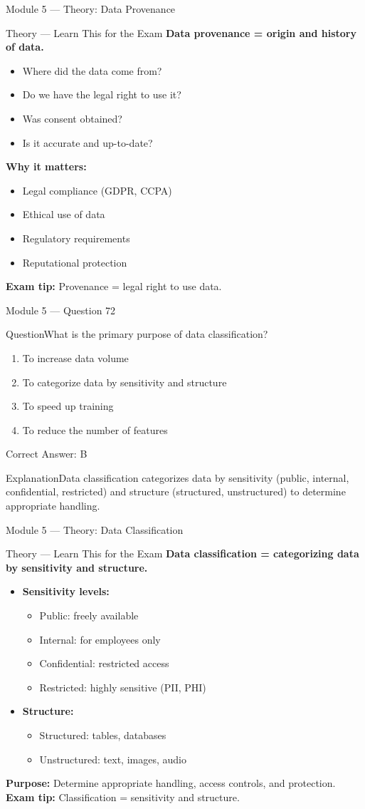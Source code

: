 \documentclass[aspectratio=169,10pt]{beamer}
\newcommand{\question}[1]{\begin{block}{Question}#1\end{block}}
\newcommand{\options}[4]{%
	\begin{enumerate}[label=\Alph*.,leftmargin=*]
		\item #1
		\item #2
		\item #3
		\item #4
	\end{enumerate}
}
\newcommand{\answerbox}[1]{\begin{exampleblock}{Correct Answer: #1}\end{exampleblock}}
\newcommand{\explain}[1]{\begin{block}{Explanation}#1\end{block}}
\newcommand{\theory}[1]{%
	\begin{block}{Theory --- Learn This for the Exam}
		\small #1
	\end{block}
}
\begin{document}
	\begin{frame}{Module 5 --- Theory: Data Provenance}
		\theory{
			\textbf{Data provenance = origin and history of data.}
			\begin{itemize}
				\item Where did the data come from?
				\item Do we have the legal right to use it?
				\item Was consent obtained?
				\item Is it accurate and up-to-date?
			\end{itemize}
			\textbf{Why it matters:}
			\begin{itemize}
				\item Legal compliance (GDPR, CCPA)
				\item Ethical use of data
				\item Regulatory requirements
				\item Reputational protection
			\end{itemize}
			\textbf{Exam tip:} Provenance = legal right to use data.
		}
	\end{frame}
	
	\begin{frame}{Module 5 --- Question 72}
		\question{What is the primary purpose of data classification?}
		\options{To increase data volume}{To categorize data by sensitivity and structure}{To speed up training}{To reduce the number of features}
		\answerbox{B}
		\explain{Data classification categorizes data by sensitivity (public, internal, confidential, restricted) and structure (structured, unstructured) to determine appropriate handling.}
	\end{frame}
	
	\begin{frame}{Module 5 --- Theory: Data Classification}
		\theory{
			\textbf{Data classification = categorizing data by sensitivity and structure.}
			\begin{itemize}
				\item \textbf{Sensitivity levels:}
				\begin{itemize}
					\item Public: freely available
					\item Internal: for employees only
					\item Confidential: restricted access
					\item Restricted: highly sensitive (PII, PHI)
				\end{itemize}
				\item \textbf{Structure:}
				\begin{itemize}
					\item Structured: tables, databases
					\item Unstructured: text, images, audio
				\end{itemize}
			\end{itemize}
			\textbf{Purpose:} Determine appropriate handling, access controls, and protection.
			\textbf{Exam tip:} Classification = sensitivity and structure.
		}
	\end{frame}
	
\end{document}
